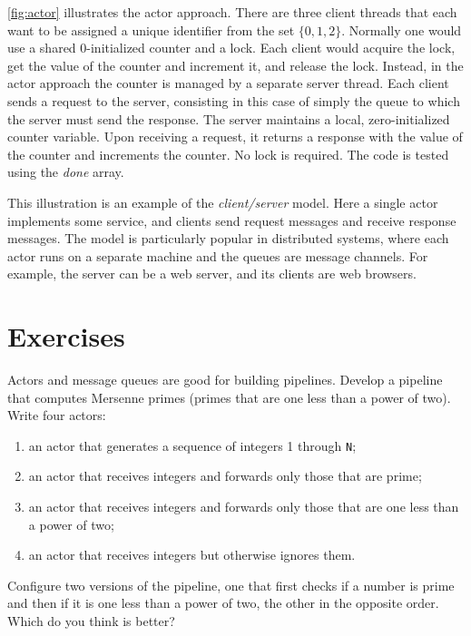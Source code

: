 \documentclass{report}
\begin{document}
\autoref{fig:actor} illustrates the actor approach.
There are three client threads that each want to be assigned
a unique identifier from the set $\{ 0, 1, 2 \}$.
Normally one would use a shared 0-initialized counter and a lock.
Each client would acquire the lock, get the value of the counter
and increment it, and release the lock.
Instead, in the actor approach the counter is managed by a
separate server thread.
Each client sends a request to the server, consisting in this case
of simply the queue to which the server must send the response.
The server maintains a local, zero-initialized counter variable.
Upon receiving a request, it returns a response with the value of
the counter and increments the counter.  No lock is required.
The code is tested using the \textit{done} array.

This illustration is an example of the \emph{client/server} model.
Here a single actor implements some service, and clients send request
messages and receive response messages.  The model is particularly
popular in distributed systems, where each actor runs on a separate
machine and the queues are message channels.  For example, the server
can be a web server, and its clients are web browsers.

\section*{Exercises}
\begin{problems}
\item Actors and message queues are good for building pipelines.
Develop a pipeline that computes Mersenne primes (primes that are one less
than a power of two).  Write four actors:
\begin{enumerate}
\item an actor that generates a sequence of integers 1 through \texttt{N};
\item an actor that receives integers and forwards only those that are prime;
\item an actor that receives integers and forwards only those that are one
less than a power of two;
\item an actor that receives integers but otherwise ignores them.
\end{enumerate}
Configure two versions of the pipeline, one that first checks if a number
is prime and then if it is one less than a power of two, the other
in the opposite order.  Which do you think is better?
\end{problems}
\end{document}
